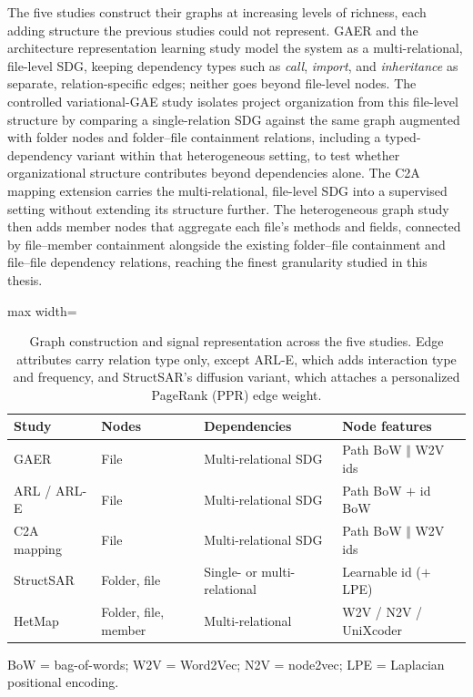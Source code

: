 The five studies construct their graphs at increasing levels of richness, each adding structure the previous studies could not represent. GAER and the architecture representation learning study model the system as a multi-relational, file-level SDG, keeping dependency types such as \emph{call}, \emph{import}, and \emph{inheritance} as separate, relation-specific edges; neither goes beyond file-level nodes. The controlled variational-GAE study isolates project organization from this file-level structure by comparing a single-relation SDG against the same graph augmented with folder nodes and folder--file containment relations, including a typed-dependency variant within that heterogeneous setting, to test whether organizational structure contributes beyond dependencies alone. The C2A mapping extension carries the multi-relational, file-level SDG into a supervised setting without extending its structure further. The heterogeneous graph study then adds member nodes that aggregate each file's methods and fields, connected by file--member containment alongside the existing folder--file containment and file--file dependency relations, reaching the finest granularity studied in this thesis.

\begin{table}[!t]
\caption{Graph construction and signal representation across the five studies. Edge attributes carry relation type only, except ARL-E, which adds interaction type and frequency, and StructSAR's diffusion variant, which attaches a personalized PageRank (PPR) edge weight.}
\label{tab:graph_signal}
\begin{threeparttable}
\begin{adjustbox}{max width=\textwidth}
\begin{tabular}{@{} l l l l @{}}
\toprule
\textbf{Study} & \textbf{Nodes} & \textbf{Dependencies} & \textbf{Node features} \\
\midrule
GAER & File & Multi-relational SDG & Path BoW $\Vert$ W2V ids \\
ARL / ARL-E & File & Multi-relational SDG & Path BoW $+$ id BoW \\
C2A mapping & File & Multi-relational SDG & Path BoW $\Vert$ W2V ids \\

\midrule
StructSAR& Folder, file & Single- or multi-relational & Learnable id ($+$LPE) \\
HetMap & Folder, file, member & Multi-relational & W2V / N2V / UniXcoder \\
\bottomrule
\end{tabular}
\end{adjustbox}
\begin{tablenotes}
\footnotesize
\item BoW = bag-of-words; W2V = Word2Vec; N2V = node2vec; LPE = Laplacian positional encoding.
\end{tablenotes}
\end{threeparttable}
\end{table}

